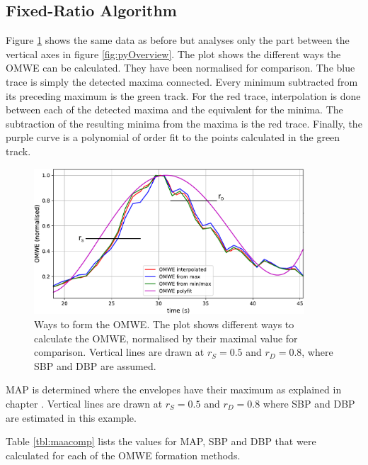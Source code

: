 \subsection{Fixed-Ratio Algorithm}\label{sec:pyfixed}

Figure \ref{fig:pyFR} shows the same data as before but analyses only the part between the vertical axes in figure \ref{fig:pyOverview}. The plot shows the different ways the OMWE can be calculated. They have been normalised for comparison. The blue trace is simply the detected maxima connected. Every minimum subtracted from its preceding maximum is the green track. For the red trace, interpolation is done between each of the detected maxima and the equivalent for the minima. The subtraction of the resulting minima from the maxima is the red trace. Finally, the purple curve is a polynomial of  order fit to the points calculated in the green track. 

\begin{figure}[ht!]
\centering
\includegraphics[width=0.9\textwidth]{figures/OMWE_normalised.pdf}
\caption{Ways to form the OMWE. The plot shows different ways to calculate the OMWE, normalised by their maximal value for comparison. Vertical lines are drawn at $r_S =0.5$ and $r_D=0.8$, where SBP and DBP are assumed.}
\label{fig:pyFR}
\end{figure} 

MAP is determined  where the envelopes have their maximum as explained in chapter . Vertical lines are drawn at $r_S=0.5$ and $r_D=0.8$ where SBP and DBP are estimated in this example.


Table \ref{tbl:maacomp} lists the values for MAP, SBP and DBP that were calculated for each of the OMWE formation methods. 

